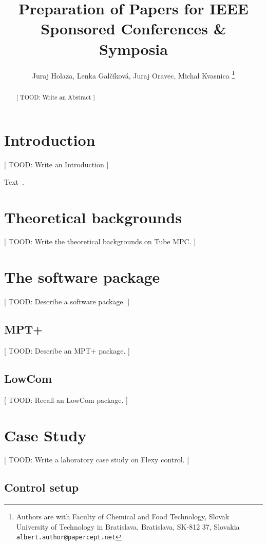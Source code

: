 \documentclass[letterpaper, 10 pt, conference]{ieeeconf}
\title{\LARGE \bf
Preparation of Papers for IEEE Sponsored Conferences \& Symposia
}
\author{Juraj Holaza, Lenka Gal\v{c}\'{i}kov\'{a}, Juraj Oravec, Michal Kvasnica
\thanks{Authors are with Faculty of Chemical and Food Technology,
		Slovak University of Technology in Bratislava, Bratislava, SK-812 37, Slovakia
        {\tt\small albert.author@papercept.net}}
}
\begin{document}
\maketitle
\thispagestyle{empty}
\pagestyle{empty}

\begin{abstract}

[ TOOD: Write an Abstract ]

\end{abstract}

\section{Introduction}
\label{sec:introduction}

[ TOOD: Write an Introduction ]

Text~\cite{IEEEexample:hyperrefsty}.

\section{Theoretical backgrounds}
\label{sec:tube_mpc}

[ TOOD: Write the theoretical backgrounds on Tube MPC. ]

\section{The software package}
\label{sec:code}

[ TOOD: Describe a software package. ]

\subsection{MPT+}
\label{sec:code_mptplus}

[ TOOD: Describe an MPT+ package. ]

\subsection{LowCom}
\label{sec:code_mpt3lowcom}

[ TOOD: Recall an LowCom package. ]

\section{Case Study}
\label{sec:case_study}

[ TOOD: Write a laboratory case study on Flexy control. ]

\subsection{Control setup}
\label{sec:control_setup}
\end{document}
